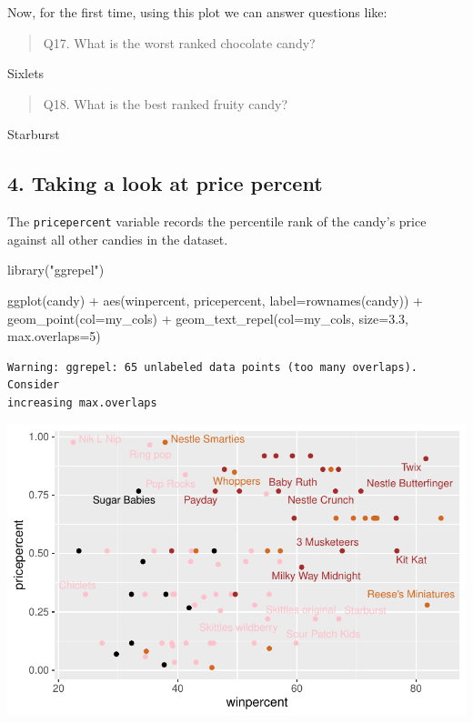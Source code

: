 \documentclass[
  letterpaper,
  DIV=11,
  numbers=noendperiod]{scrartcl}
\newenvironment{Shaded}{\begin{snugshade}}{\end{snugshade}}
\newcommand{\AttributeTok}[1]{\textcolor[rgb]{0.40,0.45,0.13}{#1}}
\newcommand{\DecValTok}[1]{\textcolor[rgb]{0.68,0.00,0.00}{#1}}
\newcommand{\FloatTok}[1]{\textcolor[rgb]{0.68,0.00,0.00}{#1}}
\newcommand{\FunctionTok}[1]{\textcolor[rgb]{0.28,0.35,0.67}{#1}}
\newcommand{\NormalTok}[1]{\textcolor[rgb]{0.00,0.23,0.31}{#1}}
\newcommand{\SpecialCharTok}[1]{\textcolor[rgb]{0.37,0.37,0.37}{#1}}
\newcommand{\StringTok}[1]{\textcolor[rgb]{0.13,0.47,0.30}{#1}}
\begin{document}
Now, for the first time, using this plot we can answer questions like:

\begin{quote}
Q17. What is the worst ranked chocolate candy?
\end{quote}

Sixlets

\begin{quote}
Q18. What is the best ranked fruity candy?
\end{quote}

Starburst

\subsection{4. Taking a look at price
percent}\label{taking-a-look-at-price-percent}

The \texttt{pricepercent} variable records the percentile rank of the
candy's price against all other candies in the dataset.

\begin{Shaded}
\begin{Highlighting}[]
\FunctionTok{library}\NormalTok{(}\StringTok{"ggrepel"}\NormalTok{)}

\FunctionTok{ggplot}\NormalTok{(candy) }\SpecialCharTok{+} 
  \FunctionTok{aes}\NormalTok{(winpercent, pricepercent, }\AttributeTok{label=}\FunctionTok{rownames}\NormalTok{(candy)) }\SpecialCharTok{+}
  \FunctionTok{geom\_point}\NormalTok{(}\AttributeTok{col=}\NormalTok{my\_cols) }\SpecialCharTok{+} 
  \FunctionTok{geom\_text\_repel}\NormalTok{(}\AttributeTok{col=}\NormalTok{my\_cols, }\AttributeTok{size=}\FloatTok{3.3}\NormalTok{, }\AttributeTok{max.overlaps=}\DecValTok{5}\NormalTok{)}
\end{Highlighting}
\end{Shaded}

\begin{verbatim}
Warning: ggrepel: 65 unlabeled data points (too many overlaps). Consider
increasing max.overlaps
\end{verbatim}

\includegraphics{Class09_files/figure-pdf/unnamed-chunk-18-1.pdf}
\end{document}
